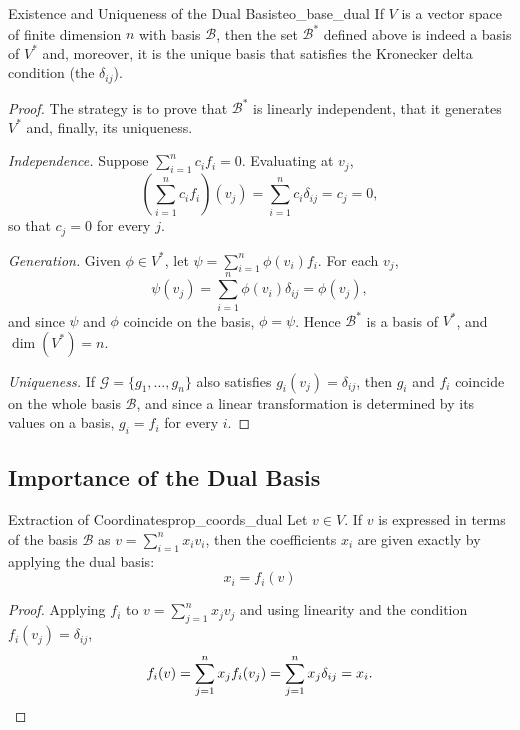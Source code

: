 \documentclass[11pt, a4paper]{article}
\begin{document}
\begin{teorema}{Existence and Uniqueness of the Dual Basis}{teo_base_dual}
If $V$ is a vector space of finite dimension $n$ with basis $\mathcal{B}$, then the set $\mathcal{B}^*$ defined above is indeed a basis of $V^*$ and, moreover, it is the unique basis that satisfies the Kronecker delta condition (the $\delta_{ij}$).
\end{teorema}

\begin{proof}
The strategy is to prove that $\mathcal{B}^*$ is linearly independent, that it generates $V^*$ and, finally, its uniqueness.

\textit{Independence.} Suppose $\sum_{i=1}^n c_i f_i = 0$. Evaluating at $v_j$,
\[
\left( \sum_{i=1}^n c_i f_i \right)(v_j) = \sum_{i=1}^n c_i \delta_{ij} = c_j = 0,
\]
so that $c_j = 0$ for every $j$.

\textit{Generation.} Given $\phi \in V^*$, let $\psi = \sum_{i=1}^n \phi(v_i) f_i$. For each $v_j$,
\[
\psi(v_j) = \sum_{i=1}^n \phi(v_i) \delta_{ij} = \phi(v_j),
\]
and since $\psi$ and $\phi$ coincide on the basis, $\phi = \psi$. Hence $\mathcal{B}^*$ is a basis of $V^*$, and $\dim(V^*) = n$.

\textit{Uniqueness.} If $\mathcal{G} = \{g_1, \dots, g_n\}$ also satisfies $g_i(v_j) = \delta_{ij}$, then $g_i$ and $f_i$ coincide on the whole basis $\mathcal{B}$, and since a linear transformation is determined by its values on a basis, $g_i = f_i$ for every $i$.
\end{proof}

\subsection{Importance of the Dual Basis}

\begin{proposicion}{Extraction of Coordinates}{prop_coords_dual}
Let $v \in V$. If $v$ is expressed in terms of the basis $\mathcal{B}$ as $v = \sum_{i=1}^n x_i v_i$, then the coefficients $x_i$ are given exactly by applying the dual basis:
\[
x_i = f_i(v)
\]
\end{proposicion}

\begin{proof}
Applying $f_i$ to $v = \sum_{j=1}^n x_j v_j$ and using linearity and the condition $f_i(v_j) = \delta_{ij}$,
\[
f_i(v) = \sum_{j=1}^n x_j f_i(v_j) = \sum_{j=1}^n x_j \delta_{ij} = x_i. \qedhere
\]
\end{proof}
\end{document}
